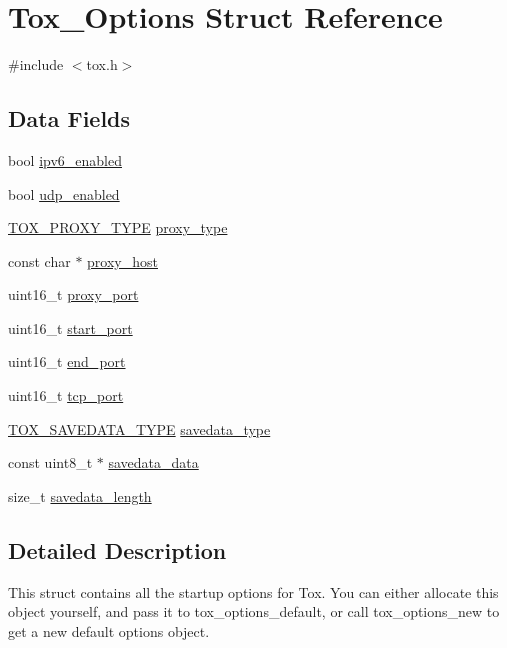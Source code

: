 \hypertarget{struct_tox___options}{\section{Tox\+\_\+\+Options Struct Reference}
\label{struct_tox___options}
}


{\ttfamily \#include $<$tox.\+h$>$}

\subsection*{Data Fields}
\begin{DoxyCompactItemize}
\item 
bool \hyperlink{struct_tox___options_a320e68fce8ebf1b6f0bb10494d800441}{ipv6\+\_\+enabled}
\item 
bool \hyperlink{struct_tox___options_a35c23f2b9cd2468e2a256ca93a21d5d5}{udp\+\_\+enabled}
\item 
\hyperlink{tox_8h_a59e95b74eb0c86442be3fe8ce831a902}{T\+O\+X\+\_\+\+P\+R\+O\+X\+Y\+\_\+\+T\+Y\+P\+E} \hyperlink{struct_tox___options_a32a512eb6e2c820735f1c51cd1075ce4}{proxy\+\_\+type}
\item 
const char $\ast$ \hyperlink{struct_tox___options_af7c34966a1703e0a031ce2674420c7cf}{proxy\+\_\+host}
\item 
uint16\+\_\+t \hyperlink{struct_tox___options_a0693366412d32f9b8ceba1bf4f320132}{proxy\+\_\+port}
\item 
uint16\+\_\+t \hyperlink{struct_tox___options_aa2de2e9258608a29877ef5d5610ea8f7}{start\+\_\+port}
\item 
uint16\+\_\+t \hyperlink{struct_tox___options_a72adaef23252363613b9ace5351ce521}{end\+\_\+port}
\item 
uint16\+\_\+t \hyperlink{struct_tox___options_a7c66715252e093e0b8b751a0c888623e}{tcp\+\_\+port}
\item 
\hyperlink{tox_8h_a01a36d032dee4dd9e79be31a13128913}{T\+O\+X\+\_\+\+S\+A\+V\+E\+D\+A\+T\+A\+\_\+\+T\+Y\+P\+E} \hyperlink{struct_tox___options_a825cfabf7be0224b12d09c8b1f5cbed6}{savedata\+\_\+type}
\item 
const uint8\+\_\+t $\ast$ \hyperlink{struct_tox___options_af298081c5f07deace07b2ced2c0a9c3d}{savedata\+\_\+data}
\item 
size\+\_\+t \hyperlink{struct_tox___options_a56c7956bddcb0d100c54e426b6e5f3ed}{savedata\+\_\+length}
\end{DoxyCompactItemize}


\subsection{Detailed Description}
This struct contains all the startup options for Tox. You can either allocate this object yourself, and pass it to tox\+\_\+options\+\_\+default, or call tox\+\_\+options\+\_\+new to get a new default options object. 

